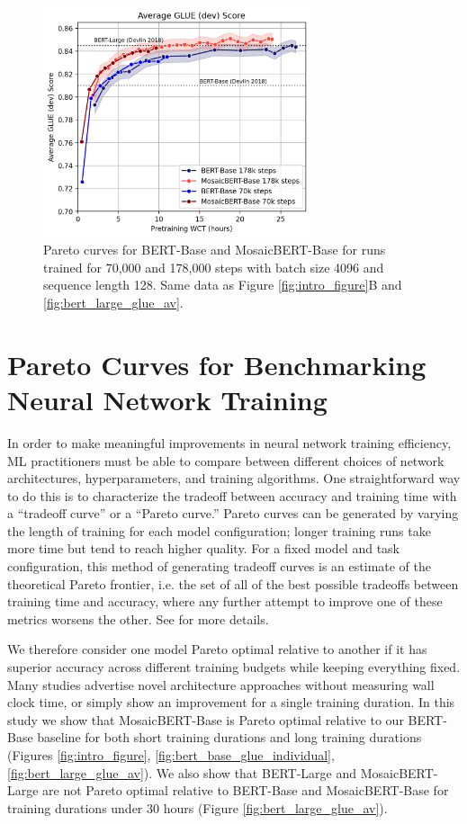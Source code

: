 \begin{figure}
    \centering
    \includegraphics[width=0.7\textwidth]{figures/pareto-comparison-12-28-222pm.png}
    \caption{Pareto curves for BERT-Base and MosaicBERT-Base for runs trained for 70,000 and 178,000 steps with batch size 4096 and sequence length 128. Same data as Figure \ref{fig:intro_figure}B and \ref{fig:bert_large_glue_av}. }
    \label{fig:pareto_comparison}
\end{figure}


\section{Pareto Curves for Benchmarking Neural Network Training}

In order to make meaningful improvements in neural network training efficiency, ML practitioners must be able to compare between different choices of network architectures, hyperparameters, and training algorithms. 
One straightforward way to do this is to characterize the tradeoff between accuracy and training time with a ``tradeoff curve'' or a ``Pareto curve.'' Pareto curves can be generated by varying the length of training for each model configuration; longer training runs take more time but tend to reach higher quality. For a fixed model and task configuration, this method of generating tradeoff curves is an estimate of the theoretical Pareto frontier, i.e. the set of all of the best possible tradeoffs between training time and accuracy, where any further attempt to improve one of these metrics worsens the other. See \citep{mosaicml2022methodology,portes2022fast} for more details.

We therefore consider one model Pareto optimal relative to another if it has superior accuracy across different training budgets while keeping everything fixed. Many studies advertise novel architecture approaches without measuring wall clock time, or simply show an improvement for a single training duration. In this study we show that MosaicBERT-Base is Pareto optimal relative to our BERT-Base baseline for both short training durations and long training durations (Figures \ref{fig:intro_figure}, \ref{fig:bert_base_glue_individual}, \ref{fig:bert_large_glue_av}). We also show that BERT-Large and MosaicBERT-Large are not Pareto optimal relative to BERT-Base and MosaicBERT-Base for training durations under 30 hours (Figure \ref{fig:bert_large_glue_av}).

